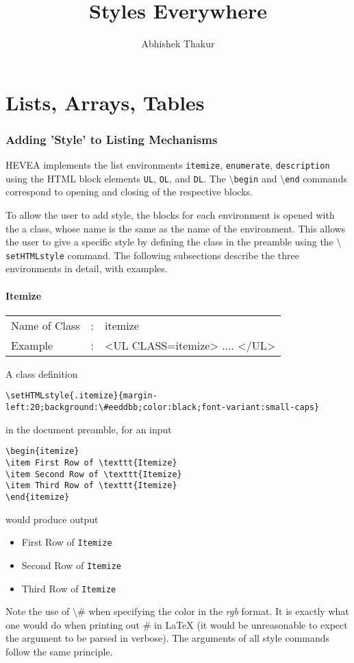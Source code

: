\documentclass {article}
\title {Styles Everywhere}
\author {Abhishek Thakur}
\begin{document}
\maketitle

\part{Lists, Arrays, Tables}

\section {Adding 'Style' to Listing Mechanisms}
HEVEA implements the list environments \texttt{itemize}, \texttt{enumerate}, \texttt{description} using the HTML block elements \texttt{UL}, \texttt{OL}, and \texttt{DL}. The \texttt{$\setminus$begin} and \texttt{$\setminus$end} commands correspond to opening and closing of the respective blocks. 

To allow the user to add style, the blocks for each environment is opened with the a class, whose name is the same as the name of the environment. This allows the user to give a specific style by defining the class in the preamble using the \texttt{$\setminus$setHTMLstyle} command. The following subsections describe the three environments in detail, with examples. 

\subsection{Itemize}
\begin{tabular}{lll}
Name of Class & : & itemize\\
Example & : & <UL CLASS=itemize> .... </UL>\\
\end{tabular}

A class definition 
\begin{verbatim}
\setHTMLstyle{.itemize}{margin-left:20;background:\#eeddbb;color:black;font-variant:small-caps}
\end{verbatim}
in the document preamble, for an input 
\begin{verbatim}
\begin{itemize}
\item First Row of \texttt{Itemize}
\item Second Row of \texttt{Itemize}
\item Third Row of \texttt{Itemize}
\end{itemize}
\end{verbatim}
would produce output 
\begin{itemize}
\item First Row of \texttt{Itemize}
\item Second Row of \texttt{Itemize}
\item Third Row of \texttt{Itemize}
\end{itemize}
Note the use of $\setminus$\# when specifying the color in the \emph{rgb} format. It is exactly what one would do when printing out \# in \LaTeX{} (it would be unreasonable to expect the argument to be parsed in verbose). The arguments of all style commands follow the same principle.
\end{document}
